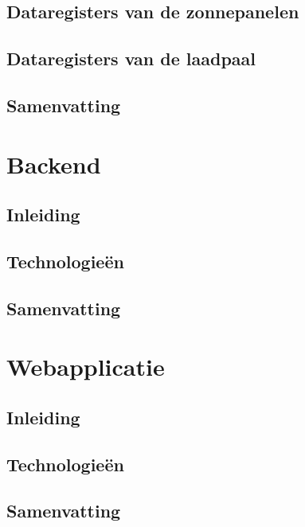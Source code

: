 \subsection{Dataregisters van de zonnepanelen}
\label{sec:stand-van-zaken-dataregisters-zonnepanelen}

\subsection{Dataregisters van de laadpaal}
\label{sec:stand-van-zaken-dataregisters-laadpaal}

\subsection{Samenvatting}
\label{sec:stand-van-zaken-dataregisters-samenvatting}

\section{Backend}
\label{sec:stand-van-zaken-backend}

\subsection{Inleiding}
\label{sec:stand-van-zaken-backend-inleiding}

\subsection{Technologieën}
\label{sec:stand-van-zaken-backend-technologieen}

\subsection{Samenvatting}
\label{sec:stand-van-zaken-backend-samenvatting}

\section{Webapplicatie}
\label{sec:stand-van-zaken-webapplicatie}

\subsection{Inleiding}
\label{sec:stand-van-zaken-webapplicatie-inleiding}

\subsection{Technologieën}
\label{sec:stand-van-zaken-webapplicatie-technologieen}

\subsection{Samenvatting}
\label{sec:stand-van-zaken-webapplicatie-samenvatting}
